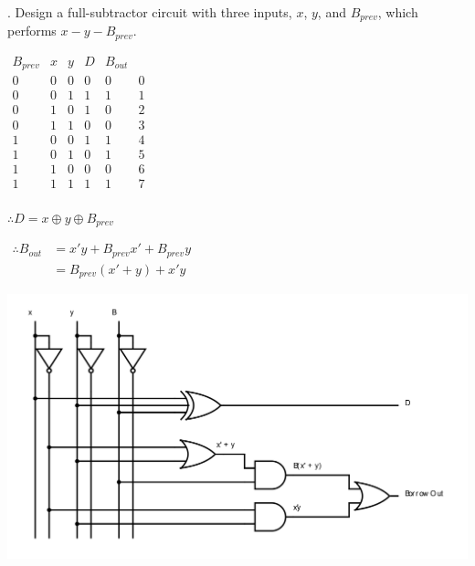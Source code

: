 \documentclass[12pt]{book}
\newenvironment{indented} {
	\begin{list}{}{\setlength{\leftmargin}{5mm}}
	\item[]
}{\end{list}}
\begin{document}
	. Design a full-subtractor circuit with three inputs, $x$, $y$, and $B_{prev}$, which performs
	\linebreak $x-y-B_{prev}$.
	\begin{indented}
		$\begin{array}{c|c|c||c|c||c}
			B_{prev} & x & y & D & B_{out}\\
			\hline
			0 & 0 & 0 & 0 & 0 & 0 \\
			0 & 0 & 1 & 1 & 1 & 1 \\
			0 & 1 & 0 & 1 & 0 & 2 \\
			0 & 1 & 1 & 0 & 0 & 3 \\
			1 & 0 & 0 & 1 & 1 & 4 \\
			1 & 0 & 1 & 0 & 1 & 5 \\
			1 & 1 & 0 & 0 & 0 & 6 \\
			1 & 1 & 1 & 1 & 1 & 7 \\
		\end{array}$
	
		\begin{multicols}{2}
			\begin{karnaugh-map}[4][2][1][(D) $xy$][$B_{prev}$]
				
			\end{karnaugh-map}
			
			\columnbreak
			
			\begin{karnaugh-map}[4][2][1][($B_{out}$) $xy$][$B_{prev}$]
				
			\end{karnaugh-map}
			\footnotemark
			
		\end{multicols}

		$\therefore D = x \oplus y \oplus B_{prev}$

		$\begin{aligned}
			\therefore B_{out} &= x'y + B_{prev}x' + B_{prev}y\\
			&= B_{prev}(x' + y) + x'y
		\end{aligned}$
	\end{indented}

	\includegraphics{q2_full_subtractor}

\end{document}
